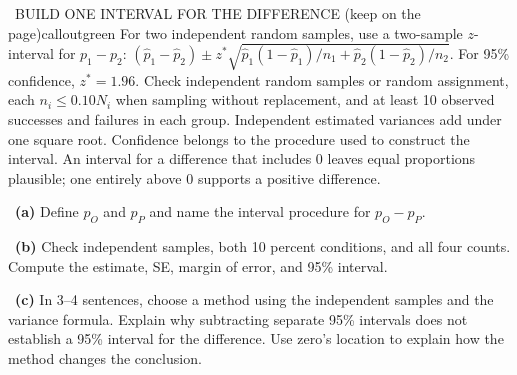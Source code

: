 \documentclass[11pt]{article}
\begin{document}
\begin{callout}{\IconBook\ BUILD ONE INTERVAL FOR THE DIFFERENCE (keep on the page)}{calloutgreen}
For two independent random samples, use a two-sample $z$-interval for $p_1-p_2$:
$(\hat p_1-\hat p_2)\pm z^*\sqrt{\hat p_1(1-\hat p_1)/n_1+\hat p_2(1-\hat p_2)/n_2}$.
For 95\% confidence, $z^*=1.96$. Check independent random samples or random assignment,
each $n_i\leq0.10N_i$ when sampling without replacement, and at least 10 observed successes and failures in each group.
Independent estimated variances add under one square root. Confidence belongs to the procedure used to construct the interval.
An interval for a difference that includes 0 leaves equal proportions plausible; one entirely above 0 supports a positive difference.
\end{callout}

~\textbf{(a)} Define $p_O$ and $p_P$ and name the interval procedure for $p_O-p_P$.\par
{}

~\textbf{(b)} Check independent samples, both 10 percent conditions, and all four counts. Compute the estimate, SE, margin of error, and 95\% interval.\par
{}

~\textbf{(c)} In 3--4 sentences, choose a method using the independent samples and the variance formula. Explain why subtracting separate 95\% intervals does not establish a 95\% interval for the difference. Use zero's location to explain how the method changes the conclusion.\par
{}
\end{document}
